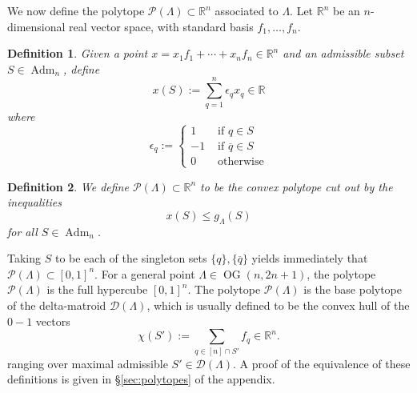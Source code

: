 \documentclass[12pt]{amsart}
\newtheorem{definition}{Definition}[subsection]
\DeclareMathOperator{\Adm}{Adm}
\DeclareMathOperator{\OG}{OG}
\newcommand{\cD}{\mathcal{D}}
\newcommand{\cP}{\mathcal{P}}
\newcommand{\bR}{\mathbb{R}}
\newcommand{\barq}{\overline{q}}
\begin{document}
We now define the polytope $\cP(\Lambda)\subset\bR^n$ associated to $\Lambda$. Let $\mathbb{R}^n$ be an $n$-dimensional real vector space, with standard basis $f_1,\ldots,f_n$. 

\begin{definition}\label{def:x(S)}
Given a point $x=x_1f_1+\cdots+x_nf_n\in\mathbb{R}^n$ and an admissible subset $S\in\Adm_n$, define 
\begin{equation*}
    x(S):=\sum_{q=1}^{n}\epsilon_qx_q\in\mathbb{R}
\end{equation*}
where
\begin{equation*}
    \epsilon_q:=
    \begin{cases}
        1&\text{ if }q\in S\\
        -1&\text{ if }\barq\in S\\
        0&\text{ otherwise}
    \end{cases}
\end{equation*}
\end{definition}

\begin{definition}\label{def:polytope}
    We define $\cP(\Lambda)\subset\bR^n$ to be the convex polytope cut out by the inequalities
    \begin{equation*}
        x(S)\le g_\Lambda(S)
    \end{equation*}
    for all $S\in\Adm_n$.
\end{definition}
Taking $S$ to be each of the singleton sets $\{q\},\{\barq\}$ yields immediately that $\cP(\Lambda)\subset[0,1]^n$. For a general point $\Lambda\in\OG(n,2n+1)$, the polytope $\cP(\Lambda)$ is the full hypercube $[0,1]^n$. The polytope $\cP(\Lambda)$ is the base polytope of the delta-matroid $\cD(\Lambda)$, which is usually defined to be the convex hull of the $0-1$ vectors
\begin{equation*}
    \chi(S'):=\sum_{q\in [n]\cap S'}f_q\in\mathbb{R}^n.
\end{equation*}
ranging over maximal admissible $S'\in\cD(\Lambda)$. A proof of the equivalence of these definitions is given in \S\ref{sec:polytopes} of the appendix. 
\end{document}
